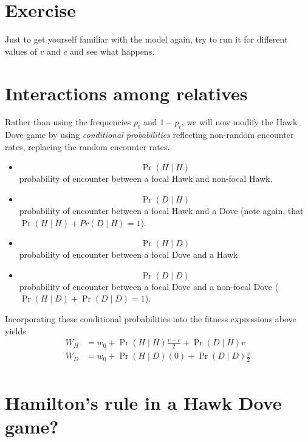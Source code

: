 \documentclass[
]{book}
\providecommand{\tightlist}{%
  \setlength{\itemsep}{0pt}\setlength{\parskip}{0pt}}
\begin{document}
\hypertarget{exercise-6}{%
\section{Exercise}\label{exercise-6}}

Just to get yourself familiar with the model again, try to run it for different values of \(v\) and \(c\) and see what happens.

\hypertarget{interactions-among-relatives}{%
\section{Interactions among relatives}\label{interactions-among-relatives}}

Rather than using the frequencies \(p_{t}\) and \(1-p_{t}\), we will now modify the Hawk Dove game by using \emph{conditional probabilities} reflecting non-random encounter rates, replacing the random encounter rates.

\begin{itemize}
\tightlist
\item
  \[ \Pr(H \mid H)\] probability of encounter between a focal Hawk and non-focal Hawk.
\item
  \[ \Pr(D \mid H)\] probability of encounter between a focal Hawk and a Dove (note again, that \(\Pr(H \mid H) + Pr(D \mid H) = 1\)).
\item
  \[ \Pr(H \mid D)\] probability of encounter between a focal Dove and a Hawk.
\item
  \[ \Pr(D \mid D)\] probability of encounter between a focal Dove and a non-focal Dove (\(\Pr(H \mid D) + \Pr(D \mid D) = 1\)).
\end{itemize}

Incorporating these conditional probabilities into the fitness expressions above yields
\begin{align}
W_{H} &= w_{0} + \Pr(H\mid H) \frac{v-c}{2} +  \Pr (D \mid H ) v \label{eq:wH} \\
W_{D} &= w_{0} + \Pr (H \mid D) (0) + \Pr ( D \mid D )  \frac{v}{2} \label{eq:wD}\\
\end{align}

\hypertarget{hamiltons-rule-in-a-hawk-dove-game}{%
\section{Hamilton's rule in a Hawk Dove game?}\label{hamiltons-rule-in-a-hawk-dove-game}}
\end{document}
